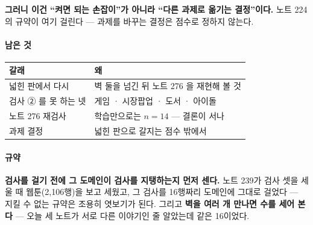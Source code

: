 \documentclass[10pt]{article}
\begin{document}
\textbf{그러니 이건 ``켜면 되는 손잡이''가 아니라 ``다른 과제로 옮기는
결정''이다.} 노트 224의 규약이 여기 걸린다 --- 과제를 바꾸는 결정은 점수로
정하지 않는다.

\paragraph{남은 것}
\begin{center}\small
\begin{tabular}{ll}
\hline
갈래 & 왜 \\
\hline
넓힌 판에서 다시 & 벽 둘을 넘긴 뒤 노트 276 을 재현해 볼 것 \\
검사 ② 를 못 하는 넷 & 게임 · 시장팝업 · 도서 · 아이돌 \\
노트 276 재검사 & 학습만으로는 $n{=}14$ --- 결론이 서나 \\
과제 결정 & 넓힌 판으로 갈지는 점수 밖에서 \\
\hline
\end{tabular}
\end{center}

\paragraph{규약} \textbf{검사를 걸기 전에 그 도메인이 검사를 지탱하는지
먼저 센다.} 노트 239가 검사 셋을 세울 때 웹툰(2,106행)을 보고 세웠고, 그
검사를 16행짜리 도메인에 그대로 걸었다 --- 지킬 수 없는 규약은 조용히
엿보기가 된다. 그리고 \textbf{벽을 여러 개 만나면 수를 세어 본다} --- 오늘
세 노트가 서로 다른 이야기인 줄 알았는데 같은 16이었다.
\end{document}
